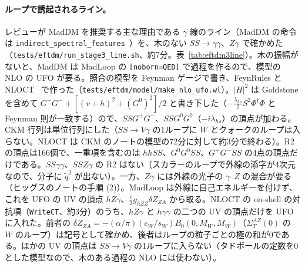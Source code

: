 \documentclass[a4paper,10pt]{ltjsarticle}
\begin{document}
\paragraph{ループで誘起されるライン。}レビューが MadDM を推奨する主な理由である $\gamma$ 線のライン（MadDM の命令は \texttt{indirect\_spectral\_features}~\cite{maddm32}）を、木のない $SS\to\gamma\gamma$、$Z\gamma$ で確かめた（\nolinkurl{tests/eftdm/run_stage3_line.sh}、約7分。表~\ref{tab:eftdm3line}）。木の振幅がないと、MadDM は MadLoop の \texttt{[noborn=QED]} で過程を作るので、模型の NLO の UFO が要る。照合の模型を Feynman ゲージで書き、FeynRules と NLOCT~\cite{nloct} で作った（\nolinkurl{tests/eftdm/model/make_nlo_ufo.wl}）。$|H|^2$ は Goldstone を含めて $G^+G^-+[(v+h)^2+(G^0)^2]/2$ と書き下した（$-\frac{\lambda_{hs}}2S^2\Phi^\dagger\Phi$ と Feynman 則が一致する）ので、$SSG^+G^-$、$SSG^0G^0$（$-i\lambda_{hs}$）の頂点が加わる。CKM 行列は単位行列にした（$SS\to V\gamma$ の1ループに $W$ とクォークのループは入らない。NLOCT は CKM のノートの模型の72分に対して約3分で終わる）。R2 の頂点は166個で、一重項を含むのは $hhSS$、$G^0G^0SS$、$G^+G^-SS$ の4点の頂点だけである。$SS\gamma\gamma$、$SSZ\gamma$ の R2 はない（スカラーのループで外線の添字が4次元なので、分子に $\tilde q^2$ が出ない）。一方、$Z\gamma$ には外線の光子の $\gamma$--$Z$ の混合が要る（ヒッグスのノートの手順 (2)）。MadLoop は外線に自己エネルギーを付けず、これを UFO の UV の頂点 $hZ\gamma$、$\frac i2g_{hZZ}\delta Z_{ZA}$ から取る。NLOCT の on-shell の対抗項（\texttt{WriteCT}、約3分）のうち、$hZ\gamma$ と $h\gamma\gamma$ の二つの UV の頂点だけを UFO に入れた。前者の $\delta Z_{ZA}=-(\alpha/\pi)(c_W/s_W)B_0(0,M_W,M_W)$（$\Sigma_T^{AZ}(0)$ の $W$ のループ）は記号として確かめ、後者はループの粒子ごとの極の和が0である。ほかの UV の頂点は $SS\to V\gamma$ の1ループに入らない（タドポールの定数を0とした模型なので、木のある過程の NLO には使わない）。
\end{document}
